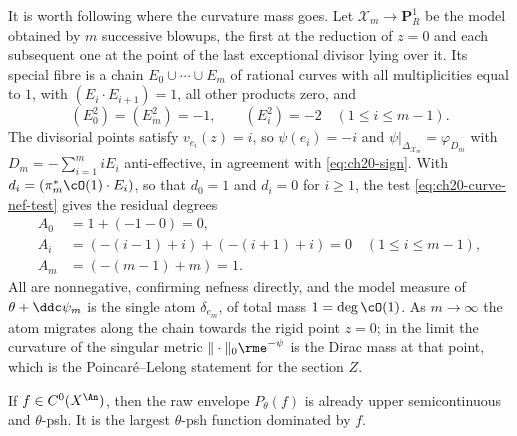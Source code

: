 \begin{example}
It is worth following where the curvature mass goes.  Let
\(\mathcal X_m\to\mathbf P^1_R\) be the model obtained by \(m\) successive
blowups, the first at the reduction of \(z=0\) and each subsequent one at the
point of the last exceptional divisor lying over it.  Its special fibre is a
chain \(E_0\cup\cdots\cup E_m\) of rational curves with all multiplicities
equal to \(1\), with \((E_i\cdot E_{i+1})=1\), all other products zero, and
\[
 (E_0^2)=(E_m^2)=-1,\qquad (E_i^2)=-2\quad(1\leq i\leq m-1).
\]
The divisorial points satisfy \(v_{e_i}(z)=i\), so
\(\psi(e_i)=-i\) and \(\psi|_{\Delta_{\mathcal X_m}}=\varphi_{D_m}\) with
\(D_m=-\sum_{i=1}^m iE_i\) anti-effective, in agreement with
\eqref{eq:ch20-sign}.  With \(d_i=(\pi_m^*\cO(1)\cdot E_i)\), so that
\(d_0=1\) and \(d_i=0\) for \(i\geq1\), the test
\eqref{eq:ch20-curve-nef-test} gives the residual degrees
\[
 \begin{aligned}
 A_0&=1+(-1-0)=0,\\
 A_i&=(-(i-1)+i)+(-(i+1)+i)=0\quad(1\leq i\leq m-1),\\
 A_m&=(-(m-1)+m)=1.
 \end{aligned}
\]
All are nonnegative, confirming nefness directly, and the model measure of
\(\theta+\ddc\psi_m\) is the single atom \(\delta_{e_m}\), of total mass
\(1=\deg\cO(1)\).  As \(m\to\infty\) the atom migrates along the chain
towards the rigid point \(z=0\); in the limit the curvature of the singular
metric \(\|\cdot\|_0\rme^{-\psi}\) is the Dirac mass at that point, which is
the Poincar\'e--Lelong statement for the section \(Z\).
\end{example}

\begin{corollary}\label{cor:ch23-continuous-obstacle-psh}
If \(f\in C^0(X^{\An})\), then the raw envelope \(P_\theta(f)\) is already
upper semicontinuous and \(\theta\)-psh.  It is the largest
\(\theta\)-psh function dominated by \(f\).
\end{corollary}

